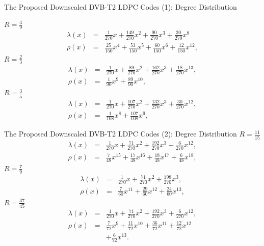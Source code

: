 \documentclass[11pt, aspectratio=169]{beamer}
\begin{document}
\begin{frame}{The Proposed Downscaled DVB-T2 LDPC Codes (1): Degree Distribution}

{\footnotesize  $R=\frac{4}{9}$ 
\begin{eqnarray}
\lambda (x)&=&\frac{1}{270}x+\frac{149}{270}x^2+\frac{90}{270}x^3+\frac{30}{270}x^8 \\
\rho(x)&=&\frac{25}{150}x^4+\frac{53}{150}x^5+\frac{60}{150}x^6+\frac{12}{150}x^{12},
\end{eqnarray}
$R=\frac{2}{3}$ 
\begin{eqnarray}
\lambda (x)&=&\frac{1}{270}x+\frac{89}{270}x^{2}+\frac{162}{270}x^{3}+\frac{18}{270}x^{13},\\
\rho(x)&=&\frac{1}{90}x^{9}+\frac{89}{90}x^{10},
\end{eqnarray}
$R=\frac{3}{5}$
\begin{eqnarray}
\lambda (x)&=&\frac{1}{270}x+\frac{107}{270}x^2+\frac{132}{270}x^3+\frac{30}{270}x^{12},\\
\rho(x)&=&\frac{1}{108}x^8+\frac{107}{108}x^9,
\end{eqnarray}
}
\end{frame}
\begin{frame}{The Proposed Downscaled DVB-T2 LDPC Codes (2): Degree Distribution}
$R=\frac{11}{15}$
\begin{eqnarray}
\lambda (x)&=&\frac{1}{270}x+\frac{71}{270}x^{2}+\frac{192}{270}x^{3}+\frac{6}{270}x^{12},\\
\rho(x)&=&\frac{7}{48}x^{15}+\frac{17}{48}x^{16}+\frac{18}{48}x^{17}+\frac{6}{48}x^{18},
\end{eqnarray}
$R=\frac{7}{9}$
\begin{eqnarray}
\lambda (x)&=&\frac{1}{270}x+\frac{71}{270}x^2+\frac{198}{270}x^3,\\
\rho(x)&=&\frac{7}{60}x^{11}+\frac{29}{60}x^{12}+\frac{24}{60}x^{13},
\end{eqnarray}
$R=\frac{37}{45}$
\begin{eqnarray}
\lambda (x)&=&\frac{1}{270}x+\frac{71}{270}x^{2}+\frac{192}{270}x^{3}+\frac{6}{270}x^{12},\\
\rho(x)&=&\frac{7}{72}x^{9}+\frac{11}{72}x^{10}+\frac{36}{72}x^{11}+\frac{12}{72}x^{12} \nonumber \\ &&+\frac{6}{72}x^{13}.
\end{eqnarray}


\end{frame}
\end{document}
